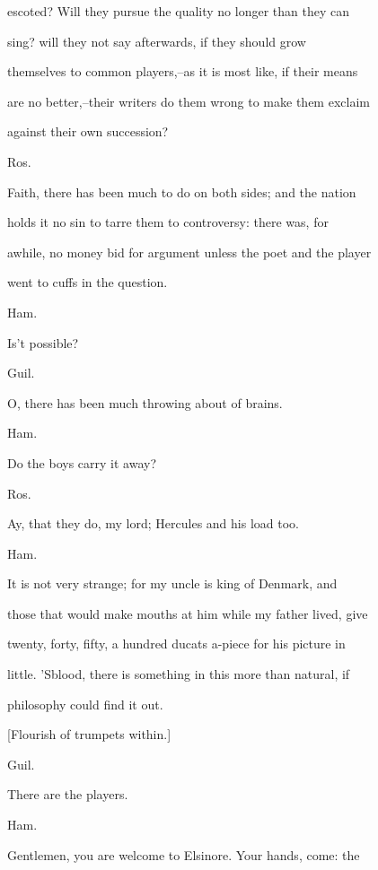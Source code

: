 \documentclass[12pt]{book}
\begin{document}
escoted? Will they pursue the quality no longer than they can

sing? will they not say afterwards, if they should grow

themselves to common players,--as it is most like, if their means

are no better,--their writers do them wrong to make them exclaim

against their own succession?



Ros.

Faith, there has been much to do on both sides; and the nation

holds it no sin to tarre them to controversy: there was, for

awhile, no money bid for argument unless the poet and the player

went to cuffs in the question.



Ham.

Is't possible?



Guil.

O, there has been much throwing about of brains.



Ham.

Do the boys carry it away?



Ros.

Ay, that they do, my lord; Hercules and his load too.



Ham.

It is not very strange; for my uncle is king of Denmark, and

those that would make mouths at him while my father lived, give

twenty, forty, fifty, a hundred ducats a-piece for his picture in

little. 'Sblood, there is something in this more than natural, if

philosophy could find it out.



[Flourish of trumpets within.]



Guil.

There are the players.



Ham.

Gentlemen, you are welcome to Elsinore. Your hands, come: the
\end{document}
